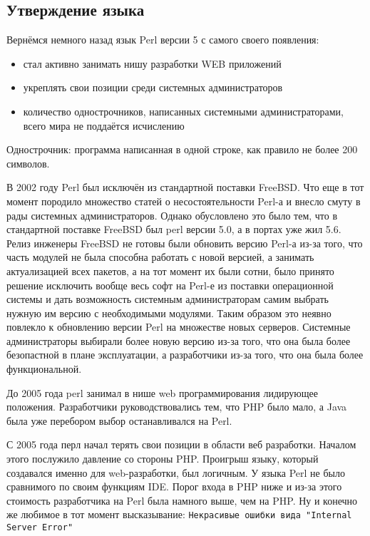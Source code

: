 \subsection{Утверждение языка}
Вернёмся немного назад язык Perl версии 5 с самого своего появления:
\begin{itemize}
 \item стал активно занимать нишу разработки WEB приложений
 \item укреплять свои позиции среди системных администраторов
 \item количество однострочников, написанных системными администраторами, всего мира не поддаётся исчислению
\end{itemize}

Однострочник: программа написанная в одной строке, как правило не более 200 символов.

В 2002 году Perl был исключён из стандартной поставки FreeBSD. Что еще в тот момент породило множество статей  о несостоятельности Perl-а и внесло смуту в рады системных администраторов. Однако обусловлено это было тем, что в стандартной поставке FreeBSD был perl версии 5.0, а в портах уже жил 5.6. Релиз инженеры FreeBSD не готовы были обновить версию Perl-а из-за того, что часть модулей не была способна работать с новой версией, а занимать актуализацией всех пакетов, а на тот момент их были сотни, было принято решение исключить вообще весь софт на Perl-е из поставки операционной системы и дать возможность системным администраторам самим выбрать нужную им версию с необходимыми модулями. Таким образом это неявно повлекло к обновлению версии Perl на множестве новых серверов. Системные администраторы выбирали более новую версию из-за того, что она была более безопастной в плане эксплуатации, а разработчики из-за того, что она была более функциональной.

До 2005 года perl занимал в нише web программирования лидирующее положения. Разработчики руководствовались тем, что PHP было мало, а Java была уже перебором выбор останавливался на Perl.

С 2005 года перл начал терять свои позиции в области веб разработки. Началом этого послужило давление со стороны PHP. Проигрыш языку, который создавался именно для web-разработки, был логичным. У языка Perl не было сравнимого по своим функциям IDE. Порог входа в PHP ниже и из-за этого стоимость разработчика на Perl была намного выше, чем на PHP. Ну и конечно же любимое в тот момент высказывание: \verb|Некрасивые ошибки вида "Internal Server Error"|

